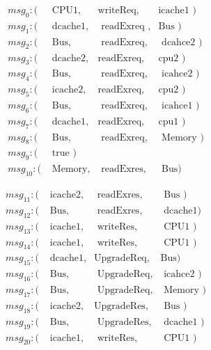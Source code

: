 \documentclass[12pt,frontmatter,copyright,thesis]{usfmanus}
\begin{document}
\begin{appendix}
\begin{figure}[h]
\begin{minipage}{.5\textwidth}
 {\footnotesize
 \[
 \begin{array}{llll}
 msg_0: (&\mbox{ CPU1},&\mbox{writeReq},&\mbox{icache1   })\\       
 msg_1: (&\mbox{ dcache1},&\mbox{ readExreq },&\mbox{Bus     })\\        
 msg_2: (&\mbox{ Bus},&\mbox{ readExreq},&\mbox{ dcahce2 })\\  
 msg_3: (&\mbox{ dcache2},&\mbox{readExreq},&\mbox{cpu2         })\\   
 msg_4: (&\mbox{ Bus},&\mbox{ readExreq},&\mbox{ icahce2           })\\  
 msg_5: (&\mbox{ icache2},&\mbox{readExreq},&\mbox{cpu2 })\\  
 msg_6: (&\mbox{ Bus},&\mbox{ readExreq},&\mbox{ icahce1       })\\     
 msg_7: (&\mbox{ dcache1},&\mbox{readExreq},&\mbox{cpu1           })\\  
 msg_8: (&\mbox{ Bus},&\mbox{ readExreq},&\mbox{ Memory })\\  
 msg_9: (&\mbox{ true                                          })\\  
 msg_{10}: (&\mbox{ Memory},&\mbox{ readExres},&\mbox{ Bus})
  \end{array}
 \]}
\end{minipage}
\begin{minipage}{.5\textwidth}
 {\footnotesize
 \[
 \begin{array}{llll}
 msg_{11}: (&\mbox{ icache2},&\mbox{ readExres},&\mbox{ Bus })\\  
 msg_{12}: (&\mbox{ Bus},&\mbox{ readExres},&\mbox{ dcache1})\\  
 msg_{13}: (&\mbox{ icache1},&\mbox{ writeRes},&\mbox{ CPU1         })\\  
 msg_{14}: (&\mbox{ icache1},&\mbox{ writeRes},&\mbox{ CPU1 })\\  
 msg_{15}: (&\mbox{ dcache1},&\mbox{UpgradeReq},&\mbox{Bus})\\  
 msg_{16}: (&\mbox{ Bus},&\mbox{ UpgradeReq},&\mbox{ icahce2      })\\   
 msg_{17}: (&\mbox{ Bus},&\mbox{ UpgradeReq},&\mbox{ Memory })\\  
 msg_{18}: (&\mbox{ icache2},&\mbox{UpgradeRes},&\mbox{ Bus     })\\  
 msg_{19}: (&\mbox{ Bus},&\mbox{ UpgradeRes},&\mbox{ dcache1      })\\  
 msg_{20}: (&\mbox{ icache1},&\mbox{ writeRes},&\mbox{ CPU1 })\\
 \\

\end{array}\]}
\end{minipage}
\end{figure}
\end{appendix}
\end{document}
